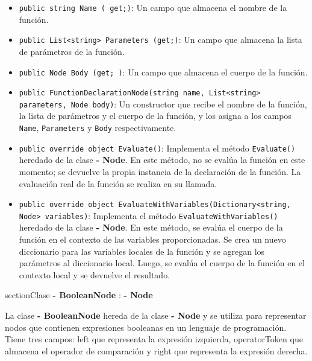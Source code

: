 \documentclass{article}
\newcommand{\subclassed}[1]{\textcolor{classcolor}{\textbf{- #1}}}
\begin{document}
\begin{itemize}
    \item \lstinline{public string Name ( get;)}: Un campo que almacena el nombre de la función.

    \item \lstinline{public List<string> Parameters (get;)}: Un campo que almacena la lista de parámetros de la función.

    \item \lstinline{public Node Body (get; )}: Un campo que almacena el cuerpo de la función.

    \item \lstinline{public FunctionDeclarationNode(string name, List<string> parameters, Node body)}: Un constructor que recibe el nombre de la función, la lista de parámetros y el cuerpo de la función, y los asigna a los campos \lstinline{Name}, \lstinline{Parameters} y \lstinline{Body} respectivamente.

    \item \lstinline{public override object Evaluate()}: Implementa el método \lstinline{Evaluate()} heredado de la clase \subclassed{Node}. En este método, no se evalúa la función en este momento; se devuelve la propia instancia de la declaración de la función. La evaluación real de la función se realiza en su llamada.

    \item \lstinline{public override object EvaluateWithVariables(Dictionary<string, Node> variables)}: Implementa el método \lstinline{EvaluateWithVariables()} heredado de la clase \subclassed{Node}. En este método, se evalúa el cuerpo de la función en el contexto de las variables proporcionadas. Se crea un nuevo diccionario para las variables locales de la función y se agregan los parámetros al diccionario local. Luego, se evalúa el cuerpo de la función en el contexto local y se devuelve el resultado.
\end{itemize}
section{Clase \subclassed{BooleanNode} : \subclassed{Node}}

La clase \subclassed{BooleanNode} hereda de la clase \subclassed{Node} y se utiliza para representar nodos que contienen expresiones booleanas en un lenguaje de programación. Tiene tres campos: \textcolor{fieldcolor}{left} que representa la expresión izquierda, \textcolor{fieldcolor}{operatorToken} que almacena el operador de comparación y \textcolor{fieldcolor}{right} que representa la expresión derecha.
\end{document}
